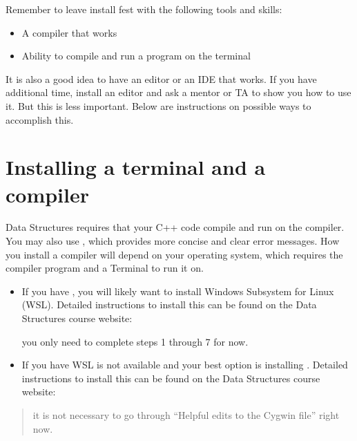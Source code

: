 \documentclass[letterpaper,10pt,english]{sphinxmanual}
\begin{document}
Remember to leave install fest with the following tools and skills:
\begin{itemize}
\item {} 
A compiler that works

\item {} 
Ability to compile and run a program on the terminal

\end{itemize}

It is also a good idea to have an editor or an IDE that works. If you
have additional time, install an editor and ask a mentor or TA to show
you how to use it. But this is less important. Below are instructions
on possible ways to accomplish this.


\section{Installing a terminal and a compiler}
\label{\detokenize{lecture_notes/setting_up_for_ds:installing-a-terminal-and-a-compiler}}
Data Structures requires that your C++ code compile and run on the
 compiler. You may also use , which
provides more concise and clear error messages. How you install a
compiler will depend on your operating system, which requires the
compiler program and a Terminal to run it on.
\begin{itemize}
\item {} 
If you have , you will likely want to install
Windows Subsystem for Linux (WSL). Detailed instructions to install
this can be found on the Data Structures course website:


 you only need to complete steps 1 through 7 for now.

\item {} 
If you have  WSL is not available and your best
option is installing . Detailed instructions to install this
can be found on the Data Structures course website:


\end{itemize}
\begin{quote}

 it is not necessary to go through “Helpful edits to the
Cygwin  file” right now.
\end{quote}
\end{document}

